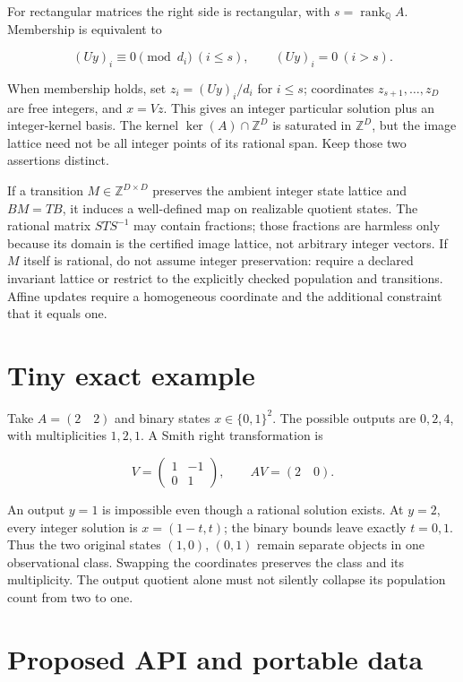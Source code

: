 \documentclass[
  11pt,
  a4paper,
]{report}
\begin{document}
For rectangular matrices the right side is rectangular, with
\(s=\operatorname{rank}_{\mathbb Q}A\). Membership is equivalent to

\[
(Uy)_i\equiv0\pmod{d_i}\ (i\le s),\qquad (Uy)_i=0\ (i>s).
\]

When membership holds, set \(z_i=(Uy)_i/d_i\) for \(i\le s\);
coordinates \(z_{s+1},\ldots,z_D\) are free integers, and \(x=Vz\). This
gives an integer particular solution plus an integer-kernel basis. The
kernel \(\ker(A)\cap\mathbb Z^D\) is saturated in \(\mathbb Z^D\), but
the image lattice need not be all integer points of its rational span.
Keep those two assertions distinct.

If a transition \(M\in\mathbb Z^{D\times D}\) preserves the ambient
integer state lattice and \(BM=TB\), it induces a well-defined map on
realizable quotient states. The rational matrix \(STS^{-1}\) may contain
fractions; those fractions are harmless only because its domain is the
certified image lattice, not arbitrary integer vectors. If \(M\) itself
is rational, do not assume integer preservation: require a declared
invariant lattice or restrict to the explicitly checked population and
transitions. Affine updates require a homogeneous coordinate and the
additional constraint that it equals one.

\hypertarget{tiny-exact-example}{%
\section{Tiny exact example}\label{tiny-exact-example}}

Take \(A=(2\quad2)\) and binary states \(x\in\{0,1\}^2\). The possible
outputs are \(0,2,4\), with multiplicities \(1,2,1\). A Smith right
transformation is

\[
V=\begin{pmatrix}1&-1\\0&1\end{pmatrix},\qquad AV=(2\quad0).
\]

An output \(y=1\) is impossible even though a rational solution exists.
At \(y=2\), every integer solution is \(x=(1-t,t)\); the binary bounds
leave exactly \(t=0,1\). Thus the two original states \((1,0)\),
\((0,1)\) remain separate objects in one observational class. Swapping
the coordinates preserves the class and its multiplicity. The output
quotient alone must not silently collapse its population count from two
to one.

\hypertarget{proposed-api-and-portable-data-1}{%
\section{Proposed API and portable
data}\label{proposed-api-and-portable-data-1}}
\end{document}

